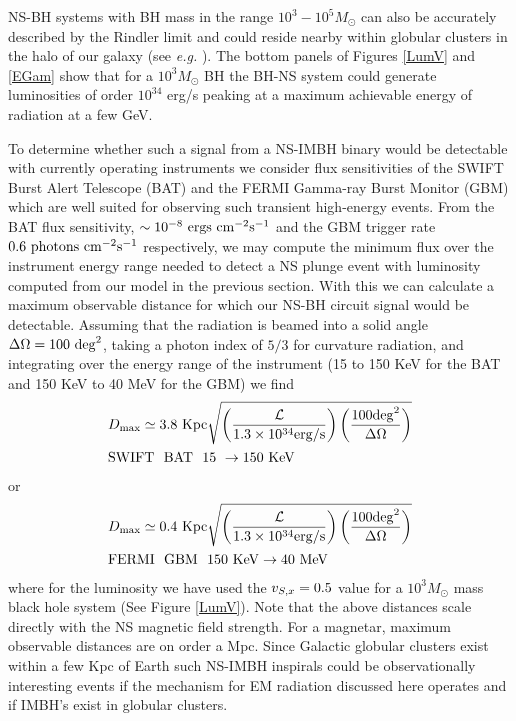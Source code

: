 NS-BH systems with BH mass in the range $10^3-10^5 M_{\odot}$ can
also be accurately described by the Rindler limit and could reside
nearby within globular clusters in the halo of our galaxy (see
\textit{e.g.} \citep{Lutzgendorf:2012}). The bottom panels of Figures
\ref{LumV} and \ref{EGam} show that for a $10^3 M_{\odot}$ BH the
BH-NS system could generate luminosities of order $10^{34}$ erg/s
peaking at a maximum achievable energy of radiation at a few GeV. 

To determine whether such a signal from a NS-IMBH binary would be detectable with currently operating instruments we consider flux sensitivities of the SWIFT Burst Alert Telescope (BAT) \citep{SWIFTBAT:2005} and the FERMI Gamma-ray Burst Monitor (GBM) \citep{FERMIGBM:2009} which are well suited for observing such transient high-energy events. From the BAT flux sensitivity, $\sim 10^{-8} \ \rm{ergs} \ \rm{cm}^{-2}  \rm{s}^{-1}$ and the GBM trigger rate $0.6 \ \rm{photons}\ \rm{cm}^{-2} \rm{s}^{-1}$ respectively, we may compute the minimum flux over the instrument energy range needed to detect a NS plunge event with luminosity computed from our model in the previous section. With this we can calculate a maximum observable distance for which our NS-BH circuit signal would be detectable. Assuming that the radiation is beamed into a solid angle $\Delta \Omega = 100 \ \rm{deg}^2$, taking a photon index of $5/3$ for curvature radiation, and integrating over the energy range of the instrument (15 to 150 KeV for the BAT and 150 KeV to 40 MeV for the GBM) we find 
\begin{align}
&D_{\rm{max}} \simeq  3.8 \ \rm{Kpc}  \sqrt{ \left(\frac{\mathcal{L}}{1.3 \times 10^{34} \rm{erg/s}} \right) \left( \frac{100 \rm{deg}^2}{\Delta \Omega} \right)  } \nonumber \\
& \rm{SWIFT} \ \ \rm{BAT}  \ \ 15\ \rightarrow 150\ \rm{KeV} \nonumber 
\end{align}
or
\begin{align}
&D_{\rm{max}} \simeq  0.4 \  \rm{Kpc} \sqrt{ \left(\frac{\mathcal{L}}{1.3 \times 10^{34} \rm{erg/s}} \right) \left( \frac{100 \rm{deg}^2}{\Delta \Omega} \right)  }\nonumber \\
& \rm{FERMI} \ \ \rm{GBM}  \ \ 150\ \rm{KeV} \rightarrow 40\ \rm{MeV}\nonumber 
\end{align}
where for the luminosity we have used the $v_{S, x}=0.5$ value for a $10^3 M_{\odot}$ mass black hole system (See Figure \ref{LumV}). Note that the above distances scale directly with the NS magnetic field strength. For a magnetar, maximum observable distances are on order a Mpc. Since Galactic globular clusters exist within a few Kpc of Earth such NS-IMBH inspirals could be observationally interesting events if the mechanism for EM radiation discussed here operates and if IMBH's exist in globular clusters.



